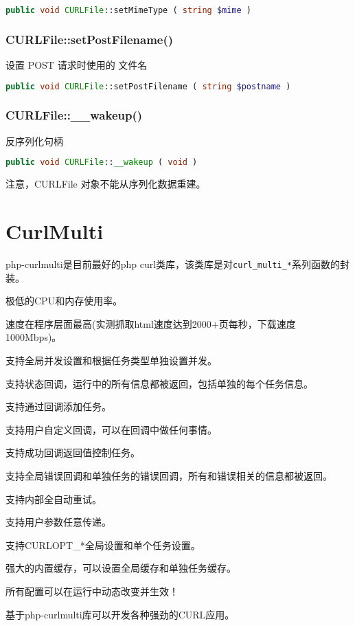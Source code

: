 \begin{lstlisting}[language=PHP]
public void CURLFile::setMimeType ( string $mime )
\end{lstlisting}


\subsection{CURLFile::setPostFilename()}

设置 POST 请求时使用的 文件名

\begin{lstlisting}[language=PHP]
public void CURLFile::setPostFilename ( string $postname )
\end{lstlisting}



\subsection{CURLFile::\_\_wakeup()}

反序列化句柄

\begin{lstlisting}[language=PHP]
public void CURLFile::__wakeup ( void )
\end{lstlisting}

注意，CURLFile 对象不能从序列化数据重建。



\chapter{CurlMulti}

php-curlmulti是目前最好的php curl类库，该类库是对\texttt{curl\_multi\_*}系列函数的封装。


\begin{compactitem}
\item 极低的CPU和内存使用率。
\item 速度在程序层面最高(实测抓取html速度达到2000+页每秒，下载速度1000Mbps)。
\item 支持全局并发设置和根据任务类型单独设置并发。
\item 支持状态回调，运行中的所有信息都被返回，包括单独的每个任务信息。
\item 支持通过回调添加任务。
\item 支持用户自定义回调，可以在回调中做任何事情。
\item 支持成功回调返回值控制任务。
\item 支持全局错误回调和单独任务的错误回调，所有和错误相关的信息都被返回。
\item 支持内部全自动重试。
\item 支持用户参数任意传递。
\item 支持CURLOPT_*全局设置和单个任务设置。
\item 强大的内置缓存，可以设置全局缓存和单独任务缓存。
\item 所有配置可以在运行中动态改变并生效！
\item 基于php-curlmulti库可以开发各种强劲的CURL应用。
\end{compactitem}



